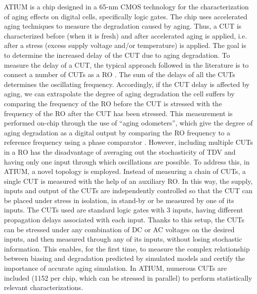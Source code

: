 ATIUM is a chip designed in a 65-nm CMOS technology for the characterization of aging effects on digital cells, specifically logic gates. The chip uses accelerated aging techniques to measure the degradation caused by aging. Thus, a \gls{CUT} is characterized before (when it is fresh) and after accelerated aging is applied, i.e. after a stress (excess supply voltage and/or temperature) is applied. The goal is to determine the increased delay of the \gls{CUT} due to aging degradation. To measure the delay of a \gls{CUT}, the typical approach followed in the literature is to connect a number of \glspl{CUT} as a \gls{RO} \cite{kimSiliconOdometerOnchip2008, keaneArraybasedOdometerSystem2011, parkAllBTINPBTI2021, islamCalibrationFreeSynthesizableOdometer2022}. The sum of the delays of all the \glspl{CUT} determines the oscillating frequency. Accordingly, if the \gls{CUT} delay is affected by aging, we can extrapolate the degree of aging degradation the cell suffers by comparing the frequency of the \gls{RO} before the \gls{CUT} is stressed with the frequency of the \gls{RO} after the \gls{CUT} has been stressed. This measurement is performed on-chip through the use of ``aging odometers'', which give the degree of aging degradation as a digital output by comparing the \gls{RO} frequency to a reference frequency using a phase comparator \cite{kimSiliconOdometerOnchip2008, keaneArraybasedOdometerSystem2011, parkAllBTINPBTI2021, islamCalibrationFreeSynthesizableOdometer2022}. However, including multiple \glspl{CUT} in a \gls{RO} has the disadvantage of averaging out the stochasticity of \gls{TDV} and having only one input through which oscillations are possible. To address this, in ATIUM, a novel topology is employed. Instead of measuring a chain of \glspl{CUT}, a single \gls{CUT} is measured with the help of an auxiliary \gls{RO}. In this way, the supply, inputs and output of the \glspl{CUT} are independently controlled so that the \gls{CUT} can be placed under stress in isolation, in stand-by or be measured by one of its inputs. The \glspl{CUT} used are standard logic gates with 3 inputs, having different propagation delays associated with each input. Thanks to this setup, the \glspl{CUT} can be stressed under any combination of DC or AC voltages on the desired inputs, and then measured through any of its inputs, without losing stochastic information. This enables, for the first time, to measure the complex relationship between biasing and degradation predicted by simulated models and certify the importance of accurate aging simulation. In ATIUM, numerous \glspl{CUT} are included (1152 per chip, which can be stressed in parallel) to perform statistically relevant characterizations.


